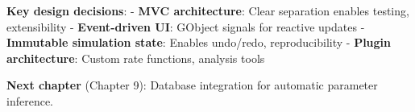 \textbf{Key design decisions}: - \textbf{MVC architecture}: Clear
separation enables testing, extensibility - \textbf{Event-driven UI}:
GObject signals for reactive updates - \textbf{Immutable simulation
state}: Enables undo/redo, reproducibility - \textbf{Plugin
architecture}: Custom rate functions, analysis tools

\textbf{Next chapter} (Chapter 9): Database integration for automatic
parameter inference.
